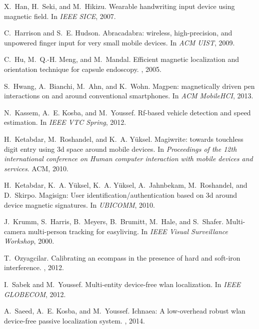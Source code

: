 \documentclass[conference]{IEEEtran}
\begin{document}
\begin{thebibliography}{10}
X.~Han, H.~Seki, and M.~Hikizu.
\newblock Wearable handwriting input device using magnetic field.
\newblock In {\em IEEE SICE}, 2007.

C.~Harrison and S.~E. Hudson.
\newblock Abracadabra: wireless, high-precision, and unpowered finger input for
  very small mobile devices.
\newblock In {\em ACM UIST}, 2009.

C.~Hu, M.~Q.-H. Meng, and M.~Mandal.
\newblock Efficient magnetic localization and orientation technique for capsule
  endoscopy.
, 2005.

S.~Hwang, A.~Bianchi, M.~Ahn, and K.~Wohn.
\newblock Magpen: magnetically driven pen interactions on and around
  conventional smartphones.
\newblock In {\em ACM MobileHCI}, 2013.

N.~Kassem, A.~E. Kosba, and M.~Youssef.
\newblock Rf-based vehicle detection and speed estimation.
\newblock In {\em IEEE VTC Spring}, 2012.

H.~Ketabdar, M.~Roshandel, and K.~A. Y{\"u}ksel.
\newblock Magiwrite: towards touchless digit entry using 3d space around mobile
  devices.
\newblock In {\em Proceedings of the 12th international conference on Human
  computer interaction with mobile devices and services}. ACM, 2010.

H.~Ketabdar, K.~A. Y{\"u}ksel, K.~A. Y{\"u}ksel, A.~Jahnbekam, M.~Roshandel,
  and D.~Skirpo.
\newblock Magisign: User identification/authentication based on 3d around
  device magnetic signatures.
\newblock In {\em UBICOMM}, 2010.

J.~Krumm, S.~Harris, B.~Meyers, B.~Brumitt, M.~Hale, and S.~Shafer.
\newblock Multi-camera multi-person tracking for easyliving.
\newblock In {\em IEEE Visual Surveillance Workshop}, 2000.

T.~Ozyagcilar.
\newblock Calibrating an ecompass in the presence of hard and soft-iron
  interference.
, 2012.

I.~Sabek and M.~Youssef.
\newblock Multi-entity device-free wlan localization.
\newblock In {\em IEEE GLOBECOM}, 2012.

A.~Saeed, A.~E. Kosba, and M.~Youssef.
\newblock Ichnaea: A low-overhead robust wlan device-free passive localization
  system.
, 2014.


\end{thebibliography}
\end{document}
